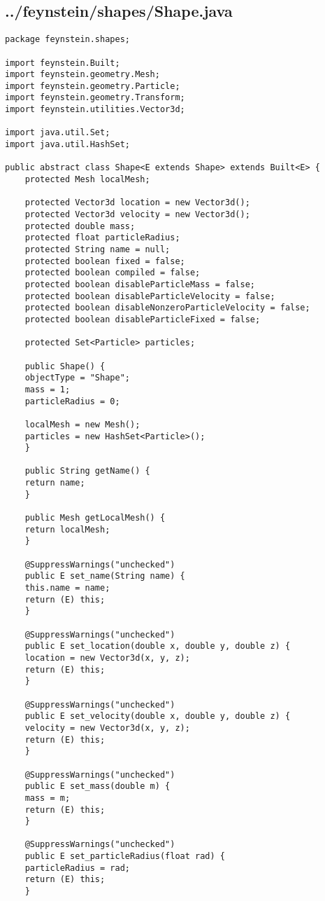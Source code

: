 \subsection*{../feynstein/shapes/Shape.java}
\begin{lstlisting}
package feynstein.shapes;

import feynstein.Built;
import feynstein.geometry.Mesh;
import feynstein.geometry.Particle;
import feynstein.geometry.Transform;
import feynstein.utilities.Vector3d;

import java.util.Set;
import java.util.HashSet;

public abstract class Shape<E extends Shape> extends Built<E> {
    protected Mesh localMesh;

    protected Vector3d location = new Vector3d();
    protected Vector3d velocity = new Vector3d();
    protected double mass;
    protected float particleRadius;
    protected String name = null;
    protected boolean fixed = false;
    protected boolean compiled = false;
    protected boolean disableParticleMass = false;
    protected boolean disableParticleVelocity = false;
    protected boolean disableNonzeroParticleVelocity = false;
    protected boolean disableParticleFixed = false;

    protected Set<Particle> particles;

    public Shape() {
	objectType = "Shape";
	mass = 1;
	particleRadius = 0;

	localMesh = new Mesh();
	particles = new HashSet<Particle>();
    }

    public String getName() {
	return name;
    }
	
    public Mesh getLocalMesh() {
	return localMesh;
    }

    @SuppressWarnings("unchecked")
    public E set_name(String name) {
	this.name = name;
	return (E) this;
    }

    @SuppressWarnings("unchecked")
    public E set_location(double x, double y, double z) {
	location = new Vector3d(x, y, z);
	return (E) this;
    }

    @SuppressWarnings("unchecked")
    public E set_velocity(double x, double y, double z) {
	velocity = new Vector3d(x, y, z);
	return (E) this;
    }

    @SuppressWarnings("unchecked")
    public E set_mass(double m) {
	mass = m;
	return (E) this;
    }
	
    @SuppressWarnings("unchecked")
    public E set_particleRadius(float rad) {
	particleRadius = rad;
	return (E) this;
    }


\end{lstlisting}
